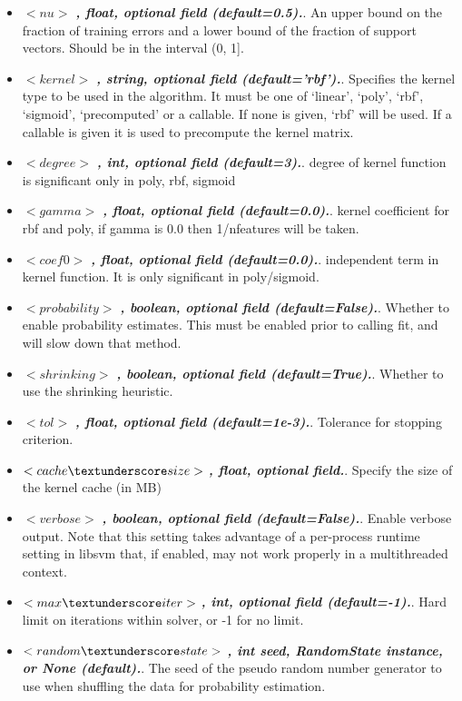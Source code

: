\begin{itemize}
  \item $<nu>$ \textbf{\textit{, float, optional field (default=0.5).}}. An upper bound on the fraction of training errors and a lower bound of the fraction of support vectors. Should be in the interval (0, 1].
  \item $<kernel>$ \textbf{\textit{, string, optional field (default=’rbf’).}}. Specifies the kernel type to be used in the algorithm. It must be one of ‘linear’, ‘poly’, ‘rbf’, ‘sigmoid’, ‘precomputed’ or a callable. If none is given, ‘rbf’ will be used. If a callable is given it is used to precompute the kernel matrix.
  \item $<degree>$ \textbf{\textit{, int, optional field (default=3).}}. degree of kernel function is significant only in poly, rbf, sigmoid
  \item $<gamma>$ \textbf{\textit{, float, optional field (default=0.0).}}. kernel coefficient for rbf and poly, if gamma is 0.0 then 1/n\textunderscore features will be taken.
  \item $<coef0>$ \textbf{\textit{, float, optional field (default=0.0).}}. independent term in kernel function. It is only significant in poly/sigmoid.
  \item $<probability>$ \textbf{\textit{, boolean, optional field (default=False).}}. Whether to enable probability estimates. This must be enabled prior to calling fit, and will slow down that method.
  \item $<shrinking>$ \textbf{\textit{, boolean, optional field (default=True).}}. Whether to use the shrinking heuristic.
  \item $<tol>$ \textbf{\textit{, float, optional field (default=1e-3).}}. Tolerance for stopping criterion.
  \item $<cache\textunderscore size>$ \textbf{\textit{, float, optional field.}}. Specify the size of the kernel cache (in MB)
  \item $<verbose>$ \textbf{\textit{, boolean, optional field (default=False).}}. Enable verbose output. Note that this setting takes advantage of a per-process runtime setting in libsvm that, if enabled, may not work properly in a multithreaded context.
  \item $<max\textunderscore iter>$ \textbf{\textit{, int, optional field (default=-1).}}. Hard limit on iterations within solver, or -1 for no limit.
  \item $<random\textunderscore state>$ \textbf{\textit{, int seed, RandomState instance, or None (default).}}. The seed of the pseudo random number generator to use when shuffling the data for probability estimation.
\end{itemize}

